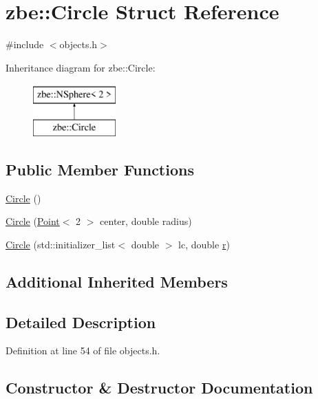 \hypertarget{structzbe_1_1_circle}{}\section{zbe\+:\+:Circle Struct Reference}
\label{structzbe_1_1_circle}


{\ttfamily \#include $<$objects.\+h$>$}

Inheritance diagram for zbe\+:\+:Circle\+:\begin{figure}[H]
\begin{center}
\leavevmode
\includegraphics[height=2.000000cm]{structzbe_1_1_circle}
\end{center}
\end{figure}
\subsection*{Public Member Functions}
\begin{DoxyCompactItemize}
\item 
\hyperlink{structzbe_1_1_circle_a360afbdef97b4c3c29a2e89d300bf82f}{Circle} ()
\item 
\hyperlink{structzbe_1_1_circle_a724549c2a9d102922eeb46208a303ca7}{Circle} (\hyperlink{classzbe_1_1_point}{Point}$<$ 2 $>$ center, double radius)
\item 
\hyperlink{structzbe_1_1_circle_a8de23687c2201fd8d26f92158b23eb56}{Circle} (std\+::initializer\+\_\+list$<$ double $>$ lc, double \hyperlink{structzbe_1_1_n_sphere_ac8fae694bd80717eec61699b4d5206c6}{r})
\end{DoxyCompactItemize}
\subsection*{Additional Inherited Members}


\subsection{Detailed Description}


Definition at line 54 of file objects.\+h.



\subsection{Constructor \& Destructor Documentation}
\hypertarget{structzbe_1_1_circle_a360afbdef97b4c3c29a2e89d300bf82f}{}
